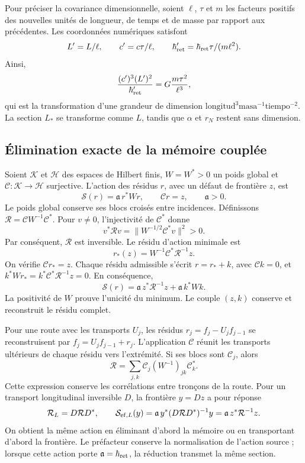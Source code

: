 Pour préciser la covariance dimensionnelle, soient \(\ell\), \(\tau\) et \(m\) les facteurs positifs des nouvelles unités de longueur, de temps et de masse par rapport aux précédentes. Les coordonnées numériques satisfont
\[
 L'=L/\ell,\qquad c'=c\tau/\ell,\qquad
 \hbar'_{\rm ret}=\hbar_{\rm ret}\tau/(m\ell^2).
\]
Ainsi,
\[
 \frac{(c')^3(L')^2}{\hbar'_{\rm ret}}
 =G\frac{m\tau^2}{\ell^3},
\]
qui est la transformation d'une grandeur de dimension
\(\mathrm{longitud}^3\mathrm{masa}^{-1}\mathrm{tiempo}^{-2}\).
La section \(L_*\) se transforme comme \(L\), tandis que \(\alpha\)
et \(r_N\) restent sans dimension.

\subsection{Élimination exacte de la mémoire couplée}

Soient \(\mathcal K\) et \(\mathcal H\) des espaces de Hilbert finis,
\(W=W^*>0\) un poids global et
\(\mathcal C:\mathcal K\to\mathcal H\) surjective. L'action
des résidus \(r\), avec un défaut de frontière \(z\), est
\[
 \mathcal S(r)=\mathfrak a\,r^*Wr,
 \qquad \mathcal Cr=z,\qquad \mathfrak a>0.
\]
Le poids global conserve ses blocs croisés entre incidences. Définissons \(\mathcal R=\mathcal CW^{-1}\mathcal C^*\). Pour \(v\ne0\), l'injectivité de \(\mathcal C^*\) donne
\[
 v^*\mathcal Rv=\|W^{-1/2}\mathcal C^*v\|^2>0.
\]
Par conséquent, \(\mathcal R\) est inversible. Le résidu d'action minimale est
\[
 r_*(z)=W^{-1}\mathcal C^*\mathcal R^{-1}z.
\]
On vérifie \(\mathcal Cr_*=z\). Chaque résidu admissible s'écrit \(r=r_*+k\), avec \(\mathcal Ck=0\), et \(k^*Wr_*=k^*\mathcal C^*\mathcal R^{-1}z=0\). En conséquence,
\begin{equation}
 \mathcal S(r)=\mathfrak a\,z^*\mathcal R^{-1}z
             +\mathfrak a\,k^*Wk.
 \label{g26:eq:accion-residuo-es}
\end{equation}
La positivité de \(W\) prouve l'unicité du minimum. Le couple
\((z,k)\) conserve et reconstruit le résidu complet.

Pour une route avec les transports \(U_j\), les résidus
\(r_j=f_j-U_jf_{j-1}\) se reconstruisent par
\(f_j=U_jf_{j-1}+r_j\). L'application \(\mathcal C\) réunit les
transports ultérieurs de chaque résidu vers l'extrémité. Si ses
blocs sont \(\mathcal C_j\), alors
\[
 \mathcal R=\sum_{j,k}\mathcal C_j(W^{-1})_{jk}\mathcal C_k^*.
\]
Cette expression conserve les corrélations entre tronçons de la route. Pour un transport longitudinal inversible \(D\), la frontière \(y=Dz\) a pour réponse
\[
 \mathcal R_L=D\mathcal RD^*,\qquad
 \mathcal S_{{\rm ef},L}(y)
 =\mathfrak a\,y^*(D\mathcal RD^*)^{-1}y
 =\mathfrak a\,z^*\mathcal R^{-1}z.
\]
On obtient la même action en éliminant d'abord la mémoire ou en transportant
d'abord la frontière. Le préfacteur conserve la normalisation de l'action
source ; lorsque cette action porte \(\mathfrak a=\hbar_{\rm ret}\), la
réduction transmet la même section.


